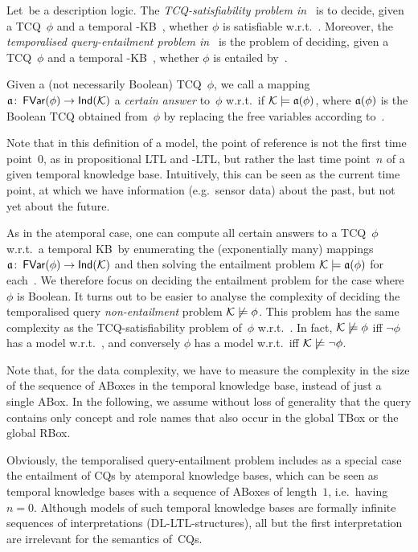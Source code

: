 \begin{definition}
    Let~\Lmc be a description logic.  The \emph{TCQ-satisfiability problem
    in~\Lmc} is to decide, given a TCQ~$\phi$ and a temporal \Lmc-KB~\Kmc,
    whether $\phi$ is satisfiable w.r.t.~\Kmc.
    Moreover, the \emph{temporalised query-entailment problem in~\Lmc} is the
    problem of deciding, given a TCQ~$\phi$ and a temporal \Lmc-KB~\Kmc, whether
    $\phi$ is entailed by~\Kmc.

    Given a (not necessarily Boolean) TCQ~$\phi$, we call a mapping
    $\mathfrak{a}\colon\operatorname{\mathsf{FVar}}(\phi)\to\mathsf{Ind}(\mathcal{K})$ a \emph{certain answer} to~$\phi$
    w.r.t.~\Kmc if $\mathcal{K}\models\mathfrak{a}(\phi)$, where $\mathfrak{a}(\phi)$ is the Boolean
    TCQ obtained from~$\phi$ by replacing the free variables according to~\amf.
\end{definition}

\noindent
Note that in this definition of a model, the point of reference is not the first
time point~$0$, as in propositional LTL and \SHOQ-LTL, but rather the last time
point~$n$ of a given temporal knowledge base.  Intuitively, this can be seen as
the current time point, at which we have information (e.g.~sensor data) about
the past, but not yet about the future.

As in the atemporal case, one can compute all certain answers to a TCQ~$\phi$
w.r.t.\ a temporal KB~\Kmc by enumerating the (exponentially many) mappings
$\mathfrak{a}\colon\operatorname{\mathsf{FVar}}(\phi)\to\mathsf{Ind}(\mathcal{K})$ and then solving the entailment problem
$\mathcal{K}\models\mathfrak{a}(\phi)$ for each~\amf.  We therefore focus on deciding the
entailment problem for the case where $\phi$ is Boolean.
%
It turns out to be easier to analyse the complexity of deciding the temporalised
query \emph{non-entailment} problem $\mathcal{K}\not\models\phi$.  This problem has the
same complexity as the TCQ-satisfiability problem of~$\phi$ w.r.t.~\Kmc.  In
fact, $\mathcal{K}\not\models\phi$ iff $\lnot\phi$ has a model w.r.t.~\Kmc, and
conversely $\phi$ has a model w.r.t.~\Kmc iff $\mathcal{K}\not\models\lnot\phi$.

Note that, for the data complexity, we have to measure the complexity in the
size of the sequence of ABoxes in the temporal knowledge base, instead of just a
single ABox.
%
In the following, we assume without loss of generality that the query contains
only concept and role names that also occur in the global TBox or the global
RBox.

Obviously, the temporalised query-entailment problem includes as a special case
the entailment of CQs by atemporal knowledge bases, which can be seen as
temporal knowledge bases with a sequence of ABoxes of length~$1$, i.e.~having
$n=0$.  Although models of such temporal knowledge bases are formally infinite
sequences of interpretations (DL-LTL-structures), all but the first
interpretation are irrelevant for the semantics of~CQs.

